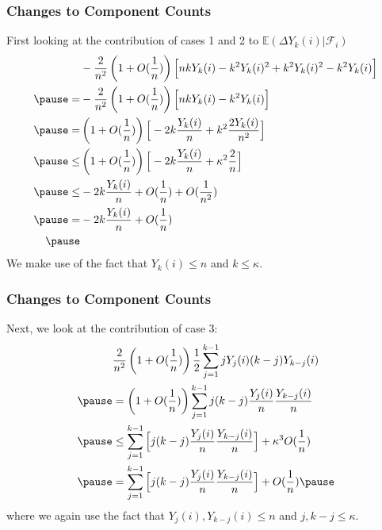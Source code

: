 \documentclass{beamer}
\begin{document}
\begin{frame}
\frametitle{Changes to Component Counts}
First looking at the contribution of cases 1 and 2 to \(\mathbb{E}(\Delta Y_{k}(i)|\mathcal{F}_{i})\)
\[
    \begin{aligned}
      &-  \frac{2}{n^{2}} \left(1 + O(\frac{1}{n})\right) \Big[  n k Y_{k}(i) - k^{2} Y_{k}(i)^{2}   + k^{2} Y_{k}(i)^{2} - k^{2} Y_{k}(i)\Big] \\ \pause
      =&  -  \frac{2}{n^{2}} \left(1 + O(\frac{1}{n})\right) \Big[  n k Y_{k}(i) - k^{2} Y_{k}(i)\Big] \\ \pause
      =& \left(1 + O(\frac{1}{n})\right)  \Big[  -2 k \frac{Y_{k}(i)}{n} + k^{2} \frac{2Y_{k}(i)}{n^{2}}\Big] \\ \pause
      \leq& \left(1 + O(\frac{1}{n})\right)  \Big[  -2 k \frac{Y_{k}(i)}{n} + \kappa^{2} \frac{2}{n}\Big] \\ \pause
      \leq& -2 k \frac{Y_{k}(i)}{n} + O(\frac{1}{n}) + O(\frac{1}{n^{2}}) \\ \pause
      =& -2 k \frac{Y_{k}(i)}{n} + O(\frac{1}{n}) \\ \pause
    \end{aligned}
\]
We make use of the fact that \(Y_{k}(i) \leq n\) and \(k \leq \kappa\).

\end{frame}

\begin{frame}
  \frametitle{Changes to Component Counts}
  Next, we look at the contribution of case 3:
  \[
    \begin{aligned}
      & \frac{2}{n^{2}} \left(1 + O(\frac{1}{n})\right) \frac{1}{2}\sum\limits_{j=1}^{k-1} j Y_{j}(i) (k - j) Y_{k-j}(i) \\ \pause
      &=  \left(1 + O(\frac{1}{n})\right) \sum\limits_{j=1}^{k-1} j (k - j) \frac{Y_{j}(i)}{n} \frac{Y_{k-j}(i)}{n} \\ \pause
      &\leq \sum\limits_{j=1}^{k-1} \Big[  j (k - j) \frac{Y_{j}(i)}{n}  \frac{Y_{k-j}(i)}{n} \Big] + \kappa^{3} O(\frac{1}{n}) \\ \pause
      &=\sum\limits_{j=1}^{k-1} \Big[  j (k - j) \frac{Y_{j}(i)}{n}  \frac{Y_{k-j}(i)}{n} \Big]+ O(\frac{1}{n}) \pause
    \end{aligned}
  \]
  where we again use the fact that \(Y_{j}(i), Y_{k-j}(i) \leq n\) and \(j, k-j \leq \kappa\).

\end{frame}
\end{document}
